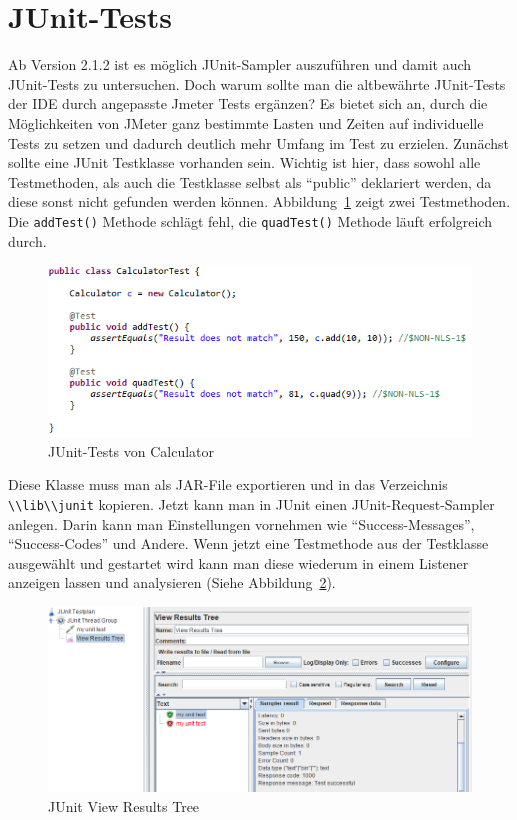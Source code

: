\documentclass[a4paper,12pt]{article}
\newcommand{\codeInLine}[1]{%
\colorbox{graybackgroundColor}{\lstinline{#1}} %
}
\begin{document}
\section{JUnit-Tests}
\label{chap:junit_tests}
Ab Version 2.1.2 ist es möglich JUnit-Sampler auszuführen und damit auch JUnit-Tests zu untersuchen. Doch warum sollte man die altbewährte JUnit-Tests der IDE durch angepasste Jmeter Tests ergänzen? Es bietet sich an, durch die Möglichkeiten von JMeter ganz bestimmte Lasten und Zeiten auf individuelle Tests zu setzen und dadurch deutlich mehr Umfang im Test zu erzielen. Zunächst sollte eine JUnit Testklasse vorhanden sein. Wichtig ist hier, dass sowohl alle Testmethoden, als auch die Testklasse selbst als "`public"' deklariert werden, da diese sonst nicht gefunden werden können. Abbildung~\ref{fig:calculator_test} zeigt zwei Testmethoden. Die \codeInLine{addTest()} Methode schlägt fehl, die \codeInLine{quadTest()} Methode läuft erfolgreich durch. 

		\begin{figure}[htb]%
 \centering
    \includegraphics[width=1\textwidth]{bilder/calculator_test.png}
  \caption{JUnit-Tests von Calculator}
  \label{fig:calculator_test}
\end{figure}

Diese Klasse muss man als JAR-File exportieren und in das Verzeichnis \codeInLine{\\lib\\junit} kopieren. Jetzt kann man in JUnit einen JUnit-Request-Sampler anlegen. Darin kann man Einstellungen vornehmen wie "`Success-Messages"', "`Success-Codes"' und Andere. Wenn jetzt eine Testmethode aus der Testklasse ausgewählt und gestartet wird kann man diese wiederum in einem Listener anzeigen lassen und analysieren (Siehe Abbildung~\ref{fig:calculator_test_jmeter}).

	\begin{figure}[htb]%
 \centering
    \includegraphics[width=1\textwidth]{bilder/calculator_test_jmeter.png}
  \caption{JUnit View Results Tree}
  \label{fig:calculator_test_jmeter}
\end{figure}
\end{document}

